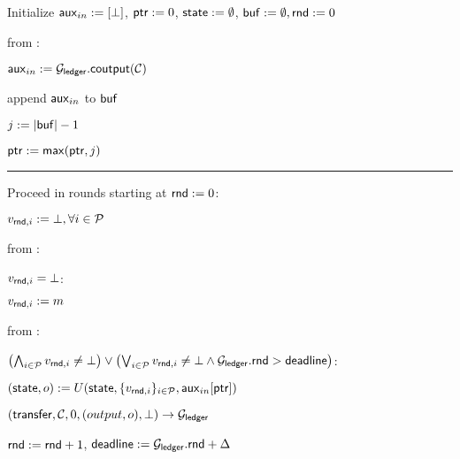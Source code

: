 \begin{bbox}[title={$\Fstate (U, \mathcal{C}, \mathcal{P} = \{P_1,...,P_N\}, \Delta)$}]

Initialize ${\mathsf {aux}}_{in} := [\bot]$, ${\mathsf {ptr}} := 0$, ${\mathsf {state}} := \emptyset$, ${\mathsf {buf}} := \emptyset, {\mathsf {rnd}} := 0$

\OnInput {} from \Partyi:

	\quad ${\mathsf {aux}}_{in} := \mathcal{G}_{{\mathsf {ledger}}}.{\mathsf {coutput}}(\mathcal{C})$

	\quad append ${\mathsf {aux}}_{in}$ to ${\mathsf {buf}}$

	\quad $j := |{\mathsf {buf}}| - 1$

	\quad ${\mathsf {ptr}} := {\mathsf {max}}({\mathsf {ptr}},j)$ 

\vspace{1mm} \hrule \vspace{1mm}

Proceed in rounds starting at ${\mathsf {rnd}} := 0$:

	$v_{{\mathsf {rnd}},i} := \bot, \forall i \in \mathcal{P}$

	\quad \OnInput {} from \Partyi:
	
		\qquad \If $v_{{\mathsf {rnd}},i} = \bot$:

			\qqquad $v_{{\mathsf {rnd}},i} := m$

	\quad \OnInput {} from \Partyi:

		\qquad \If $\left( \bigwedge_{i \in \mathcal{P}} v_{{\mathsf {rnd}},i} \neq \bot \right) \vee \left( \bigvee_{i \in \mathcal{P}} v_{{\mathsf {rnd}},i} \neq \bot \wedge \mathcal{G}_{{\mathsf {ledger}}}.{\mathsf {rnd}} > {\mathsf {deadline}} \right)$:


			\qqquad $({\mathsf {state}},o) := U({\mathsf {state}}, \{v_{{\mathsf {rnd}},i}\}_{i\in\mathcal{P}}, {\mathsf {aux}}_{in}[{\mathsf {ptr}}])$

			\qqquad \Send $({\mathsf {transfer}},\mathcal{C},0,(output, o), \bot) \rightarrow \mathcal{G}_{{\mathsf {ledger}}}$ 
			
			\qqquad ${\mathsf {rnd}} := {\mathsf {rnd}} + 1$, ${\mathsf {deadline}} := \mathcal{G}_{{\mathsf {ledger}}}.{\mathsf {rnd}} + \Delta$	

\end{bbox}
